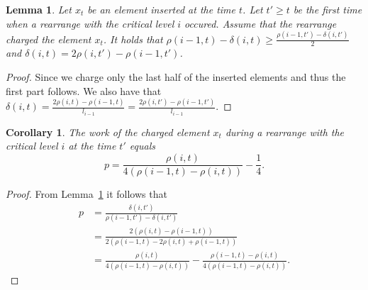 \documentclass[11pt]{article} %
\newcommand{\density}[2]{\rho(#1, #2)}
\newcommand{\rdensity}[2]{\delta(#1, #2)}
\newtheorem{lemma}[definition]{Lemma}
\newtheorem{corollary}[definition]{Corollary}
\begin{document}
\begin{lemma}
\label{lm:rdensity-density}
Let $x_t$ be an element inserted at the time $t$.
Let $t' \geq t$ be the first time when a rearrange with the critical level $i$ occured.
Assume that the rearrange charged the element $x_t$.
It holds that $\density{i - 1}{t} - \rdensity{i}{t} \geq \frac{\density{i - 1}{t'} - \rdensity{i}{t'}}{2}$ and $\rdensity{i}{t} = 2\density{i}{t'} - \density{i - 1}{t'}$.
\end{lemma}
\begin{proof}
Since we charge only the last half of the inserted elements and thus the first part follows.
We also have that $\rdensity{i}{t} = \frac{2\density{i}{t} - \density{i - 1}{t}}{l_{i - 1}} = \frac{2\density{i}{t'} - \density{i - 1}{t'}}{l_{i - 1}}$.
\end{proof}

\begin{corollary}
The work of the charged element $x_t$ during a rearrange with the critical level $i$ at the time $t'$ equals
\[
p = \frac{\density{i}{t}}{4(\density{i - 1}{t} - \density{i}{t})} - \frac{1}{4}.
\]
\end{corollary}
\begin{proof}
From Lemma~\ref{lm:rdensity-density} it follows that
\[
\begin{split}
p 	
	& = \frac{\rdensity{i}{t'}}{\density{i - 1}{t'} - \rdensity{i}{t'}} \\
	& = \frac{2(\density{i}{t} - \density{i - 1}{t})}{2(\density{i - 1}{t} - 2\density{i}{t} + \density{i - 1}{t})} \\
	& = \frac{\density{i}{t}}{4(\density{i - 1}{t} - \density{i}{t})} - \frac{\density{i - 1}{t} - \density{i}{t}}{4(\density{i - 1}{t} - \density{i}{t})}.
\end{split}
\]
\end{proof}
\end{document}
